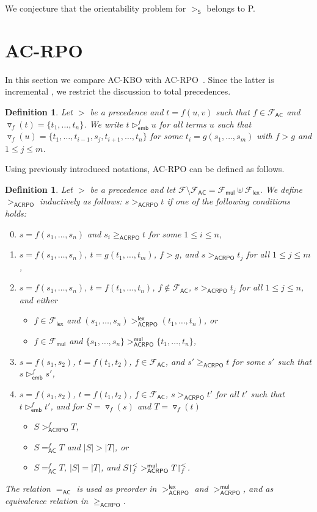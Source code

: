 \documentclass{tlp}
\newtheorem{definition}[theorem]{Definition}
\newcommand{\tf}[1]{{\triangledown_{\!#1}}}
\newcommand{\embsm}[1]{\vartriangleright^{\!#1}_{\!\mathsf{emb}}}
\newcommand{\m}[1]{\mathsf{#1}}
\newcommand{\mc}[1]{\mathcal{#1}}
\newcommand{\mr}[1]{\mathrm{#1}}
\newcommand{\lex}{\m{lex}}
\newcommand{\mul}{\m{mul}}
\newcommand{\FF}{\mc{F}}
\newcommand{\AC}{\mr{\m{AC}}}
\newcommand{\steinbach}{\mr{\m{S}}}
\newcommand{\acrpo}{\mr{\m{ACRPO}}}
\newcommand{\seq}[2][n]{{#2_1},\dots,{#2_{#1}}}
\newcommand{\rrs}[3][f]{{#2}{\restriction}^{\smash{#3}}_{#1}}
\begin{document}
We conjecture that the orientability problem for $>_\steinbach$
belongs to P.

\section{AC-RPO}
\label{AC-RPO}

In this section we compare AC-KBO with AC-RPO~\cite{R02}.
Since the latter is incremental \cite[Lemma~22]{R02},
we restrict the discussion to total precedences.

\begin{definition}
Let $>$ be a precedence and $t = f(u,v)$ such that $f \in \FF_\AC$ and 
$\tf{f}(t) = \{ \seq{t} \}$. We write
$t \embsm{f} u$ for all terms $u$ such that 
$\tf{f}(u) = \{ t_1,\ldots,t_{i-1},s_j,t_{i+1},\ldots,t_n \}$ for some 
$t_i = g(\seq[m]{s})$ with $f > g$ and $1 \leqslant j \leqslant m$.
\end{definition}

Using previously introduced notations, AC-RPO can be defined as follows.

\begin{definition}
\label{def:acrpo}
Let $>$ be a precedence
and let $\FF \setminus \FF_\AC = \FF_{\mul} \uplus \FF_{\lex}$. 
We define $>_\acrpo$ inductively as follows:
$s >_\acrpo t$ if one of the following conditions holds:
\begin{enumerate}
\setcounter{enumi}{-1}
\item
$s = f(\seq s)$ and $s_i \geqslant_\acrpo t$ for some 
$1 \leqslant i \leqslant n$,
\smallskip
\item
$s = f(\seq{s})$, $t = g(\seq[m]{t})$, $f > g$, and $s >_\acrpo t_j$ for 
all $1 \leqslant j \leqslant m$,
\smallskip
\item
$s = f(\seq{s})$, $t = f(\seq{t})$, $f \notin \FF_\AC$,
$s >_\acrpo t_j$ for all $1 \leqslant j \leqslant n$, and
either
\begin{itemize}
\item[(a)]
$f \in \FF_{\textsf{lex}}$ and $(\seq{s}) >_\acrpo^\lex (\seq{t})$, or
\smallskip
\item[(b)]
$f \in \FF_{\textsf{mul}}$ and
$\{ \seq{s} \} >_\acrpo^\mul \{ \seq{t} \}$,
\end{itemize}
\item
$s = f(s_1,s_2)$, $t = f(t_1,t_2)$, $f \in \FF_\AC$, and 
$s' \geqslant_\acrpo t$ for some $s'$ such that $s \embsm{f} s'$,
\smallskip
\item
$s = f(s_1,s_2)$, $t = f(t_1,t_2)$, $f \in \FF_\AC$, 
$s >_\acrpo t'$ for all $t'$ such that $t \embsm{f} t'$,
and for $S = \tf{f}(s)$ and $T = \tf{f}(t)$
\begin{itemize}
\item[(a)]
$S >_\acrpo^f T$,
\smallskip
\item[(b)]
$S =_\AC^f T$ and $|S| > |T|$, or
\smallskip
\item[(c)]
$S =_\AC^f T$, $|S| = |T|$, and
$\rrs{S}{<} >_\acrpo^{\mul} \rrs{T}{<}$.
\end{itemize}
\end{enumerate}
The relation $=_\AC$ is used as preorder in
$>_\acrpo^\lex$ and $>_\acrpo^\mul$, and as equivalence relation in 
$\geqslant_\acrpo$.
\end{definition}
\end{document}
